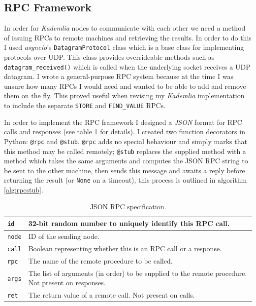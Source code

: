 \documentclass[10pt,twoside,notitlepage,a4paper]{report}
\newcommand{\kademlia}{\emph{Kademlia}}
\begin{document}
	\subsection{RPC Framework}
	In order for \kademlia{} nodes to communicate with each other we need a method of issuing RPCs to remote machines and retrieving the results. In order to do this I used \emph{asyncio}'s \texttt{DatagramProtocol} class which is a base class for implementing protocols over UDP. This class provides overrideable methods such as \texttt{datagram\_received()} which is called when the underlying socket receives a UDP datagram. I wrote a general-purpose RPC system because at the time I was unsure how many RPCs I would need and wanted to be able to add and remove them on the fly. This proved useful when revising my \kademlia{} implementation to include the separate \texttt{STORE} and \texttt{FIND\_VALUE} RPCs.
	
	In order to implement the RPC framework I designed a \emph{JSON} format for RPC calls and responses (see table \ref{tab:rpcjson} for details). I created two function decorators in Python: \texttt{@rpc} and \texttt{@stub}. \texttt{@rpc} adds no special behaviour and simply marks that this method may be called remotely; \texttt{@stub} replaces the supplied method with a method which takes the same arguments and computes the JSON RPC string to be sent to the other machine, then sends this message and awaits a reply before returning the result (or \texttt{None} on a timeout), this process is outlined in algorithm \ref{alg:rpcstub}.
	\begin{table}
		\begin{tabularx}{\textwidth}{| l | X |}
			\hline 
			\texttt{id} & 32-bit random number to uniquely identify this RPC call.\\
			\hline
			\texttt{node} & ID of the sending node.\\
			\hline
			\texttt{call} & Boolean representing whether this is an RPC call or a response.\\
			\hline
			\texttt{rpc} & The name of the remote procedure to be called.\\
			\hline
			\texttt{args} & The list of arguments (in order) to be supplied to the remote procedure. Not present on responses.\\
			\hline
			\texttt{ret} & The return value of a remote call. Not present on calls.\\
			\hline
		\end{tabularx}
	\caption{JSON RPC specification.}
	\label{tab:rpcjson}
	\end{table}
\end{document}
